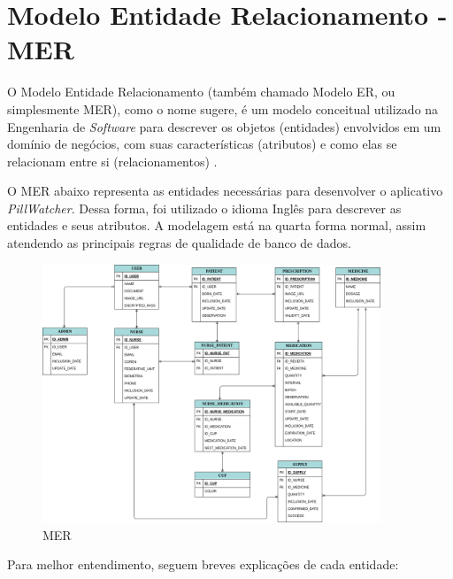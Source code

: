 \section{Modelo Entidade Relacionamento - MER}

O Modelo Entidade Relacionamento (também chamado Modelo ER, ou simplesmente MER), como o nome sugere, é um modelo conceitual utilizado na Engenharia de \textit{Software} para descrever os objetos (entidades) envolvidos em um domínio de negócios, com suas características (atributos) e como elas se relacionam entre si (relacionamentos) \cite{DEVMEDIA_2014}.

O MER abaixo representa as entidades necessárias para desenvolver o aplicativo \emph{PillWatcher}. Dessa forma, foi utilizado o idioma Inglês para descrever as entidades e seus atributos. A modelagem está na quarta forma normal, assim atendendo as principais regras de qualidade de banco de dados.

\begin{figure}[H]
    \centering
    \includegraphics[width=0.9\textwidth]{figuras/software/database.png}
    \caption{MER}
    \label{fig:der}
\end{figure}

Para melhor entendimento, seguem breves explicações de cada entidade:

